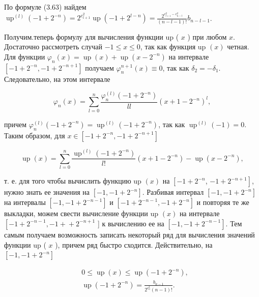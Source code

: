 \documentclass[10pt]{article}
\begin{document}
По формуле (3.63) найдем\\
$\operatorname{up}^{(l)}\left(-1+2^{-n}\right)=2^{c_{l+1}^{2}} \operatorname{up}\left(-1+2^{l-n}\right)=\frac{2^{c_{l+1}^{2}-c_{n-l}^{2}}}{(n-l-1)!} b_{n-l-1}$.

Получим.теперь формулу для вычисления функции up ( $x$ ) при любом $x$. Достаточно рассмотреть случай $-1 \leqslant x \leqslant 0$, так как функция up $(x)$ четная. Для функции $\varphi_{n}(x)=\operatorname{up}(x)+\operatorname{up}\left(x-2^{-n}\right)$ на интервале $\left[-1+2^{-n},-1+2^{-n+1}\right]$ получаем $\varphi_{n}^{n+1}(x) \equiv 0$, так как $\delta_{2}=-\delta_{1}$. Следовательно, на этом интервале


\begin{equation*}
\varphi_{n}(x)=\sum_{l=0}^{n} \frac{\varphi_{n}^{(l)}\left(-1+2^{-n}\right)}{l l}\left(x+1-2^{-n}\right)^{l}, \tag{3.70}
\end{equation*}


причем $\varphi_{n}^{(l)}\left(-1+2^{-n}\right)=\operatorname{up}^{(l)}\left(-1+2^{-n}\right)$, так как $\operatorname{up}^{(l)}(-1)=0$. Таким образом, для $x \in\left[-1+2^{-n},-1+2^{-n+1}\right]$


\begin{equation*}
\operatorname{up}(x)=\sum_{l=0}^{n} \frac{\operatorname{up}^{(l)}\left(-1+2^{-n}\right)}{l!}\left(x+1-2^{-n}\right)-\operatorname{up}\left(x-2^{-n}\right), \tag{3.71}
\end{equation*}


т. е. для того чтобы вычислить функцию up $(x)$ на $\left[-1+2^{-n}\right.$, $\left.-1+2^{-n+1}\right]$, нужно знать ее значения на $\left[-1,-1+2^{-n}\right]$. Разбивая интервал $\left[-1,-1+2^{-n}\right]$ на интервалы $\left[-1,-1+2^{-n-1}\right]$ и $\left[-1+2^{-n-1},-1+2^{-n}\right]$ и повторяя те же выкладки, можем свести вычисление функции up $(x)$ на интервале $\left[-1+2^{-n-1},-1+\right. +2^{-n+1}$ ] к вычислению ее на $\left[-1,-1+2^{-n-1}\right]$. Тем самым получаем возможность записать некоторый ряд для вычисления значений функции up ( $x$ ), причем ряд быстро сходится. Действительно, на $\left[-1,-1+2^{-n}\right]$

$$
\begin{aligned}
& 0 \leqslant \operatorname{up}(x) \leqslant \operatorname{up}\left(-1+2^{-n}\right), \\
& \operatorname{up}\left(-1+2^{-n}\right)=\frac{b_{n-1}}{2^{c_{n}^{2}}(n-1)!} .
\end{aligned}
$$
\end{document}

